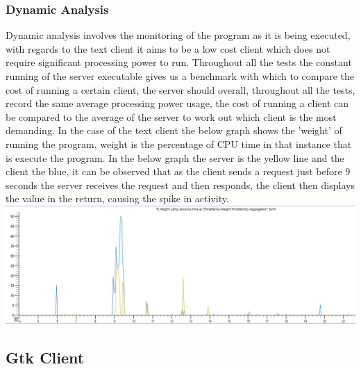 \documentclass{article}
\begin{document}
\subsubsection{Dynamic Analysis}
Dynamic analysis involves the monitoring of the program as it is being executed, with regards to the text client it aims to be a low cost client which does not require significant processing power to run. Throughout all the tests the constant running of the server executable gives us a benchmark with which to compare the cost of running a certain client, the server should overall, throughout all the tests, record the same average processing power usage, the cost of running a client can be compared to the average of the server to work out which client is the most demanding. In the case of the text client the below graph shows the 'weight' of running the program, weight is the percentage of CPU time in that instance that is execute the program. In the below graph the server is the yellow line and the client the blue, it can be observed that as the client sends a request just before 9 seconds the server receives the request and then responds, the client then displays the value in the return, causing the spike in activity.  \\
\includegraphics[width=\textwidth]{textgraph.PNG}
\subsection{Gtk Client}
\end{document}

